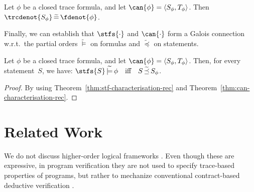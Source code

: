 \documentclass[a4paper,numberwithinsect]{lipics-v2021}
\begin{document}
\begin{theorem}
\label{thm:can-characterisation-rec}
  Let $\phi$ be a closed trace formula, and let
  $\can{\phi}=\langle S_\phi,T_\phi\rangle$.
  Then
  $\trcdenot{S_\phi} \,\widetilde{=}\, \fdenot{\phi}$.
\end{theorem}

Finally, we can establish that $\stfs{\cdot}$ and $\can{\cdot}$ form
a Galois connection w.r.t.\ the partial orders $\widetilde{\models}$ 
on formulas and $\widetilde{\preceq}$ on statements.

\begin{corollary}
\label{cor:can}
  Let $\phi$ be a closed trace formula, and let
  $\can{\phi}=\langle S_\phi,T_\phi\rangle$. Then,
  for every statement~$S$, we have:
  $ \stfs{S} \,\widetilde{\models}\, \phi
     \quad\text{iff}\quad
     S \,\widetilde{\preceq}\, S_\phi $.
\end{corollary}

\begin{proof}
  By using Theorem~\ref{thm:stf-characterisation-rec}
  and Theorem~\ref{thm:can-characterisation-rec}. 
\end{proof}


\section{Related Work}
\label{sec:related-work}

We do not discuss higher-order logical frameworks
\cite{Coq04,Isabelle02}. Even though these are expressive, in program
verification they are not used to specify trace-based properties of
programs, but rather to mechanize conventional contract-based
deductive verification \cite{Oheimb01}.
\end{document}
